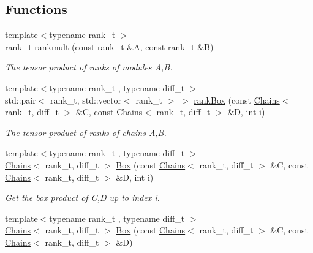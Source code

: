\subsection*{Functions}
\begin{DoxyCompactItemize}
\item 
{\footnotesize template$<$typename rank\+\_\+t $>$ }\\rank\+\_\+t \hyperlink{namespaceMackey_aaa0ce7673970bf261628768fb11a1995}{rankmult} (const rank\+\_\+t \&A, const rank\+\_\+t \&B)
\begin{DoxyCompactList}\small\item\em The tensor product of ranks of modules A,B. \end{DoxyCompactList}\item 
{\footnotesize template$<$typename rank\+\_\+t , typename diff\+\_\+t $>$ }\\std\+::pair$<$ rank\+\_\+t, std\+::vector$<$ rank\+\_\+t $>$ $>$ \hyperlink{namespaceMackey_a1257ce64369e72438023fd4e261c7c83}{rank\+Box} (const \hyperlink{classMackey_1_1Chains}{Chains}$<$ rank\+\_\+t, diff\+\_\+t $>$ \&C, const \hyperlink{classMackey_1_1Chains}{Chains}$<$ rank\+\_\+t, diff\+\_\+t $>$ \&D, int i)
\begin{DoxyCompactList}\small\item\em The tensor product of ranks of chains A,B. \end{DoxyCompactList}\item 
{\footnotesize template$<$typename rank\+\_\+t , typename diff\+\_\+t $>$ }\\\hyperlink{classMackey_1_1Chains}{Chains}$<$ rank\+\_\+t, diff\+\_\+t $>$ \hyperlink{namespaceMackey_add5b60c8e734df2be261106e0c719f82}{Box} (const \hyperlink{classMackey_1_1Chains}{Chains}$<$ rank\+\_\+t, diff\+\_\+t $>$ \&C, const \hyperlink{classMackey_1_1Chains}{Chains}$<$ rank\+\_\+t, diff\+\_\+t $>$ \&D, int i)
\begin{DoxyCompactList}\small\item\em Get the box product of C,D up to index i. \end{DoxyCompactList}\item 
{\footnotesize template$<$typename rank\+\_\+t , typename diff\+\_\+t $>$ }\\\hyperlink{classMackey_1_1Chains}{Chains}$<$ rank\+\_\+t, diff\+\_\+t $>$ \hyperlink{namespaceMackey_a72abbe3708c4e77936c8cc42fbc6753a}{Box} (const \hyperlink{classMackey_1_1Chains}{Chains}$<$ rank\+\_\+t, diff\+\_\+t $>$ \&C, const \hyperlink{classMackey_1_1Chains}{Chains}$<$ rank\+\_\+t, diff\+\_\+t $>$ \&D)

\end{DoxyCompactItemize}
